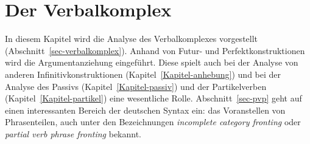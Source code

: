 

\chapter{Der Verbalkomplex}
\label{Kapitel-Verbalkomplex}

%
%


In diesem Kapitel wird die Analyse des Verbalkomplexes vorgestellt
(Abschnitt~\ref{sec-verbalkomplex}). Anhand von Futur- und Perfektkonstruktionen wird die Argumentanziehung eingeführt. Diese spielt
auch bei der Analyse von anderen Infinitivkonstruktionen (Kapitel~\ref{Kapitel-anhebung}) und bei
der Analyse des Passivs (Kapitel~\ref{Kapitel-passiv}) und der Partikelverben (Kapitel~\ref{Kapitel-partikel}) eine wesentliche Rolle. Abschnitt~\ref{sec-pvp}
geht auf einen interessanten Bereich der deutschen Syntax ein: das Voranstellen von Phrasenteilen,
auch unter den Bezeichnungen \emph{incomplete category fronting} oder \emph{partial verb phrase fronting}
bekannt.

